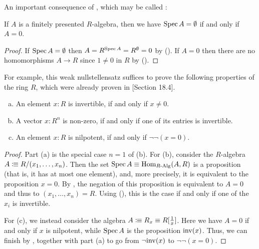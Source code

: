 An important consequence of , which may be called :

\begin{proposition}%
  \label{weak-nullstellensatz}
  If $A$ is a finitely presented $R$-algebra,
  then we have $\operatorname{Spec} A=\emptyset$ if and only if $A=0$.
\end{proposition}

\begin{proof}
  If $\operatorname{Spec} A = \emptyset$
  then $A = R^{\operatorname{Spec} A} = R^\emptyset = 0$
  by ().
  If $A = 0$
  then there are no homomorphisms $A \to R$
  since $1 \neq 0$ in $R$ by ().
\end{proof}

For example, this weak nullstellensatz suffices
to prove the following properties of the ring $R$,
which were already proven in
\cite{ingo-thesis}[Section 18.4].

\begin{proposition}%
  \label{nilpotence-double-negation}\label{non-zero-invertible}\label{generalized-field-property}
  
  \begin{enumerate}[(a)]
  \item An element $x:R$ is invertible,
    if and only if $x\neq 0$.
  \item A vector $x:R^n$ is non-zero,
    if and only if one of its entries is invertible.
  \item An element $x:R$ is nilpotent,
    if and only if $\neg \neg (x=0)$.
  \end{enumerate}
\end{proposition}

\begin{proof}
  Part (a) is the special case $n = 1$ of (b).
  For (b),
  consider the $R$-algebra $A \vcentcolon\mspace{-1.2mu}\equiv R/(x_1, \dots, x_n)$.
  Then the set $\operatorname{Spec} A \equiv \mathrm{Hom}_{R\text{-}\mathrm{Alg}}(A, R)$
  is a proposition (that is, it has at most one element),
  and, more precisely, it is equivalent to the proposition $x = 0$.
  By ,
  the negation of this proposition is equivalent to $A = 0$
  and thus to $(x_1, \dots, x_n) = R$.
  Using (),
  this is the case if and only if one of the $x_i$ is invertible.

  For (c),
  we instead consider the algebra $A \vcentcolon\mspace{-1.2mu}\equiv R_x \equiv R[\frac{1}{x}]$.
  Here we have $A = 0$ if and only if $x$ is nilpotent,
  while $\operatorname{Spec} A$ is the proposition $\mathrm{inv}(x)$.
  Thus, we can finish by ,
  together with part (a) to go from $\lnot \mathrm{inv}(x)$ to $\lnot \lnot (x = 0)$.
\end{proof}

